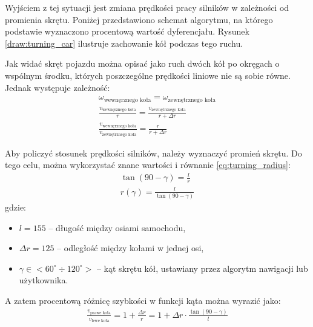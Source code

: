             Wyjściem z tej sytuacji jest zmiana prędkości pracy silników w zależności od promienia skrętu.
            Poniżej przedstawiono schemat algorytmu, na którego podstawie wyznaczono procentową wartość dyferencjału.
            Rysunek \ref{draw:turning_car} ilustruje zachowanie kół podczas tego ruchu.
            

\newpage
            Jak widać skręt pojazdu można opisać jako ruch dwóch kół po okręgach o wspólnym środku, których poszczególne prędkości liniowe nie są sobie równe.
            Jednak występuje zależność:
            \begin{gather}
                \omega_{\text{wewnęrznego koła}} = \omega_{\text{zewnętrznego koła}}\\
                \frac{v_{\text{wewnęrznego koła}}}{r} = \frac{v_{\text{zewnętrznego koła}}}{r + \Delta r}\\
                \frac{v_\text{wewnęrznego koła}}{v_{\text{zewnętrznego koła}}} = \frac{r}{r + \Delta r}
            \end{gather}

            Aby policzyć stosunek prędkości silników, należy wyznaczyć promień skrętu.
            Do tego celu, można wykorzystać znane wartości i równanie \ref{eq:turning_radius}:
            \begin{gather}
                \tan \left(90 - \gamma\right) = \frac{l}{r}\\
                r(\gamma) = \frac{l}{\tan(90-\gamma)}
                \label{eq:turning_radius}
            \end{gather}
%
            gdzie:
            \begin{itemize}
                \item $l = 155$ -- długość między osiami samochodu,
                \item $\Delta r = 125$ -- odległość między kołami w jednej osi,
                \item $\gamma \in <60^\circ \div 120^\circ>$ -- kąt skrętu kół, ustawiany przez algorytm nawigacji lub użytkownika.
            \end{itemize}

        A zatem procentową różnicę szybkości w funkcji kąta można wyrazić jako:
        \begin{gather}
            \frac{v_{\text{prawe koła}}}{v_{\text{lewe koła}}} = 1 + \frac{\Delta r}{r} = 1 + \Delta r \cdot \frac{\tan(90 - \gamma)}{l}
            \label{eq:differential}
        \end{gather}

